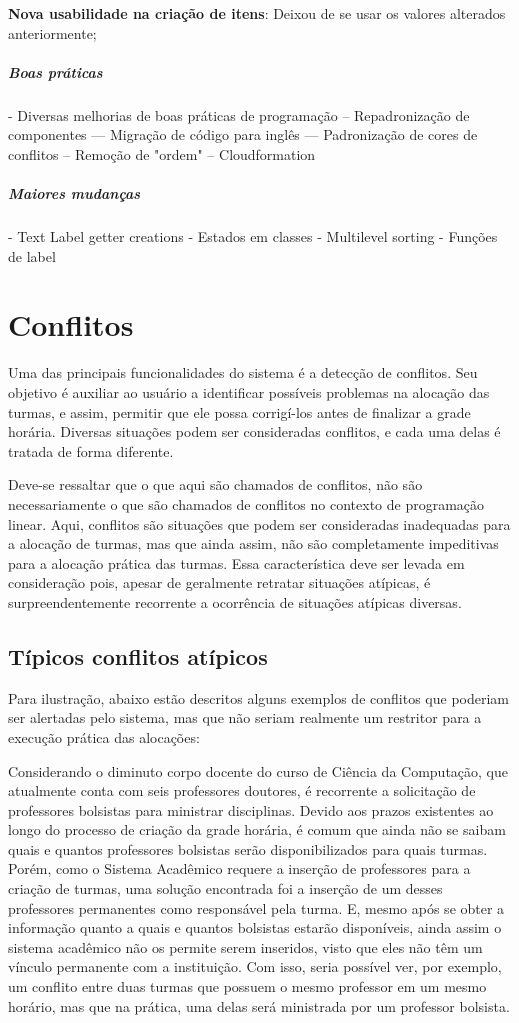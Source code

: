 \textbf{Nova usabilidade na criação de itens}: Deixou de se usar os valores alterados anteriormente;

\subparagraph*{Boas práticas}
- Diversas melhorias de boas práticas de programação
-- Repadronização de componentes
--- Migração de código para inglês
--- Padronização de cores de conflitos
-- Remoção de "ordem"
-- Cloudformation

\subparagraph*{Maiores mudanças}

- Text Label getter creations
- Estados em classes
- Multilevel sorting
- Funções de label

\section{Conflitos}\label{Conflitos} %

Uma das principais funcionalidades do sistema é a detecção de conflitos. Seu objetivo é auxiliar ao usuário a identificar possíveis problemas na alocação das turmas, e assim, permitir que ele possa corrigí-los antes de finalizar a grade horária. Diversas situações podem ser consideradas conflitos, e cada uma delas é tratada de forma diferente.

Deve-se ressaltar que o que aqui são chamados de conflitos, não são necessariamente o que são chamados de conflitos no contexto de programação linear. Aqui, conflitos são situações que podem ser consideradas inadequadas para a alocação de turmas, mas que ainda assim, não são completamente impeditivas para a alocação prática das turmas. Essa característica deve ser levada em consideração pois, apesar de geralmente retratar situações atípicas, é surpreendentemente recorrente a ocorrência de situações atípicas diversas.

\subsection{Típicos conflitos atípicos}

Para ilustração, abaixo estão descritos alguns exemplos de conflitos que poderiam ser alertadas pelo sistema, mas que não seriam realmente um restritor para a execução prática das alocações:

Considerando o diminuto corpo docente do curso de Ciência da Computação, que atualmente conta com seis professores doutores, é recorrente a solicitação de professores bolsistas para ministrar disciplinas. Devido aos prazos existentes ao longo do processo de criação da grade horária, é comum que ainda não se saibam quais e quantos professores bolsistas serão disponibilizados para quais turmas. Porém, como o Sistema Acadêmico requere a inserção de professores para a criação de turmas, uma solução encontrada foi a inserção de um desses professores permanentes como responsável pela turma. E, mesmo após se obter a informação quanto a quais e quantos bolsistas estarão disponíveis, ainda assim o sistema acadêmico não os permite serem inseridos, visto que eles não têm um vínculo permanente com a instituição. Com isso, seria possível ver, por exemplo, um conflito entre duas turmas que possuem o mesmo professor em um mesmo horário, mas que na prática, uma delas será ministrada por um professor bolsista.


